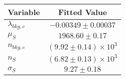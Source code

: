\begin{tabular}[t]{lc}
\hline
Variable &Fitted Value\\
\hline\hline
$\lambda_{bkg,c}$&$-0.00349\pm0.00037$\\
\hline
$\mu_{S}$&$1968.60\pm0.17$\\
\hline
$n_{bkg,c}$&$(9.92\pm0.14)\times 10^3$\\
\hline
$n_{S}$&$(6.82\pm0.13)\times 10^3$\\
\hline
$\sigma_{S}$&$9.27\pm0.18$\\
\hline
\end{tabular}